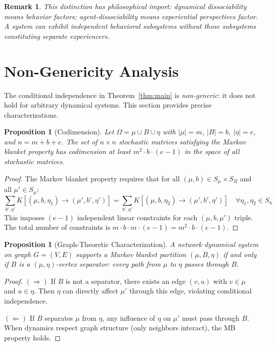 \documentclass[11pt,a4paper]{article}
\newtheorem{proposition}[theorem]{Proposition}
\newtheorem*{remark}{Remark}
\begin{document}
\begin{remark}
This distinction has philosophical import: dynamical dissociability means behavior factors; agent-dissociability means experiential perspectives factor. A system can exhibit independent behavioral subsystems without those subsystems constituting separate experiencers.
\end{remark}

\section{Non-Genericity Analysis}\label{sec:nongenericity}

The conditional independence in Theorem~\ref{thm:main} is \emph{non-generic}: it does not hold for arbitrary dynamical systems. This section provides precise characterizations.

\begin{proposition}[Codimension]\label{prop:codim}
Let $\Omega = \mu \cup B \cup \eta$ with $|\mu| = m$, $|B| = b$, $|\eta| = e$, and $n = m + b + e$. The set of $n \times n$ stochastic matrices satisfying the Markov blanket property has codimension at least $m^2 \cdot b \cdot (e - 1)$ in the space of all stochastic matrices.
\end{proposition}

\begin{proof}
The Markov blanket property requires that for all $(\mu, b) \in S_\mu \times S_B$ and all $\mu' \in S_\mu$:
\[
\sum_{b', \eta'} K[(\mu, b, \eta_1) \to (\mu', b', \eta')] = \sum_{b', \eta'} K[(\mu, b, \eta_2) \to (\mu', b', \eta')] \quad \forall \eta_1, \eta_2 \in S_\eta
\]
This imposes $(e - 1)$ independent linear constraints for each $(\mu, b, \mu')$ triple. The total number of constraints is $m \cdot b \cdot m \cdot (e - 1) = m^2 \cdot b \cdot (e - 1)$.
\end{proof}

\begin{proposition}[Graph-Theoretic Characterization]\label{prop:graph}
A network dynamical system on graph $G = (V, E)$ supports a Markov blanket partition $(\mu, B, \eta)$ if and only if $B$ is a $(\mu, \eta)$-vertex separator: every path from $\mu$ to $\eta$ passes through $B$.
\end{proposition}

\begin{proof}
$(\Rightarrow)$ If $B$ is not a separator, there exists an edge $(v, u)$ with $v \in \mu$ and $u \in \eta$. Then $\eta$ can directly affect $\mu'$ through this edge, violating conditional independence.

$(\Leftarrow)$ If $B$ separates $\mu$ from $\eta$, any influence of $\eta$ on $\mu'$ must pass through $B$. When dynamics respect graph structure (only neighbors interact), the MB property holds.
\end{proof}
\end{document}
